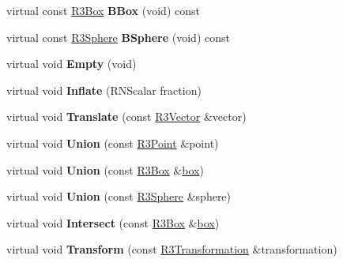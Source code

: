 \begin{DoxyCompactItemize}
\item 
virtual const \hyperlink{class_r3_box}{R3\+Box} {\bfseries B\+Box} (void) const \hypertarget{class_r3_box_a2d2bfc9e353c46e8ed2f1136fe9f12bd}{}\label{class_r3_box_a2d2bfc9e353c46e8ed2f1136fe9f12bd}

\item 
virtual const \hyperlink{class_r3_sphere}{R3\+Sphere} {\bfseries B\+Sphere} (void) const \hypertarget{class_r3_box_a190a501b96242d332a209aa79b211597}{}\label{class_r3_box_a190a501b96242d332a209aa79b211597}

\item 
virtual void {\bfseries Empty} (void)\hypertarget{class_r3_box_a92f9ae0fc669607c231840916dd369c5}{}\label{class_r3_box_a92f9ae0fc669607c231840916dd369c5}

\item 
virtual void {\bfseries Inflate} (R\+N\+Scalar fraction)\hypertarget{class_r3_box_a20f82081a2b473f0a7fe5275fe62a584}{}\label{class_r3_box_a20f82081a2b473f0a7fe5275fe62a584}

\item 
virtual void {\bfseries Translate} (const \hyperlink{class_r3_vector}{R3\+Vector} \&vector)\hypertarget{class_r3_box_a8acc8b24871c7f3c8a75a6345af9c755}{}\label{class_r3_box_a8acc8b24871c7f3c8a75a6345af9c755}

\item 
virtual void {\bfseries Union} (const \hyperlink{class_r3_point}{R3\+Point} \&point)\hypertarget{class_r3_box_a4a1eb61e7c9d419b88efc281bfdee3f2}{}\label{class_r3_box_a4a1eb61e7c9d419b88efc281bfdee3f2}

\item 
virtual void {\bfseries Union} (const \hyperlink{class_r3_box}{R3\+Box} \&\hyperlink{structbox}{box})\hypertarget{class_r3_box_a201f7f10005cc7ad64ef563e89312d62}{}\label{class_r3_box_a201f7f10005cc7ad64ef563e89312d62}

\item 
virtual void {\bfseries Union} (const \hyperlink{class_r3_sphere}{R3\+Sphere} \&sphere)\hypertarget{class_r3_box_ad814755efca4476f59ee055b571e614e}{}\label{class_r3_box_ad814755efca4476f59ee055b571e614e}

\item 
virtual void {\bfseries Intersect} (const \hyperlink{class_r3_box}{R3\+Box} \&\hyperlink{structbox}{box})\hypertarget{class_r3_box_ab18b9f4364083a0143ae99c43babc7d8}{}\label{class_r3_box_ab18b9f4364083a0143ae99c43babc7d8}

\item 
virtual void {\bfseries Transform} (const \hyperlink{class_r3_transformation}{R3\+Transformation} \&transformation)\hypertarget{class_r3_box_aa9255cbbc9c7cc9244a17f5dc79058fe}{}\label{class_r3_box_aa9255cbbc9c7cc9244a17f5dc79058fe}


\end{DoxyCompactItemize}

